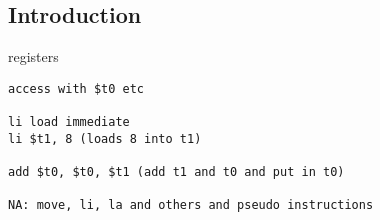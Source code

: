 
\subsection{Introduction}

registers

\begin{verbatim}
access with $t0 etc

li load immediate
li $t1, 8 (loads 8 into t1)

add $t0, $t0, $t1 (add t1 and t0 and put in t0)

NA: move, li, la and others and pseudo instructions
\end{verbatim}
